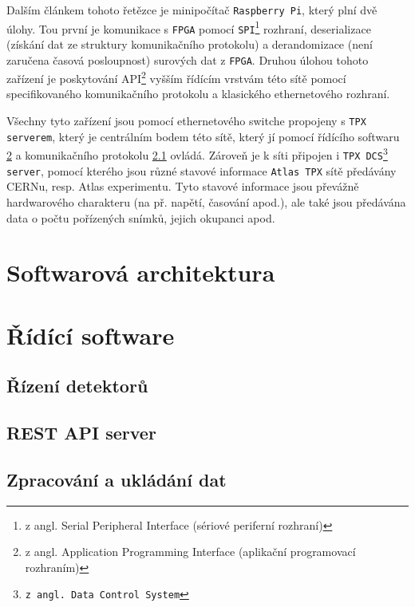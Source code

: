 Dalším článkem tohoto řetězce je minipočítač \texttt{Raspberry Pi}, který plní dvě úlohy. Tou první je komunikace s \texttt{FPGA} pomocí \texttt{SPI}\footnote{z angl. Serial Peripheral Interface (sériové periferní rozhraní)} rozhraní, deserializace (získání dat ze struktury komunikačního protokolu) a derandomizace (není zaručena časová posloupnost) surových dat z \texttt{FPGA}. Druhou úlohou tohoto zařízení je poskytování API\footnote{z angl. Application Programming Interface (aplikační programovací rozhraním)} vyšším řídícím vrstvám této sítě pomocí specifikovaného komunikačního protokolu a klasického ethernetového rozhraní.

Všechny tyto zařízení jsou pomocí ethernetového switche propojeny s \texttt{TPX serverem}, který je centrálním bodem této sítě, který jí pomocí řídícího softwaru \ref{atlas:cont} a komunikačního protokolu \ref{atlas:cont:det} ovládá. Zároveň je k síti připojen i \texttt{TPX DCS\footnote{z angl. Data Control System} server}, pomocí kterého jsou různé stavové informace \texttt{Atlas TPX} sítě předávány CERNu, resp. Atlas experimentu. Tyto stavové informace jsou převážně hardwarového charakteru (na př. napětí, časování apod.), ale také jsou předávána data o počtu pořízených snímků, jejich okupanci apod.




\clearpage
\section{Softwarová architektura}\label{atlas:sw_arch}
\section{Řídící software}\label{atlas:cont}
\subsection{Řízení detektorů}\label{atlas:cont:det}
\subsection{REST API server}
\subsection{Zpracování a ukládání dat}


